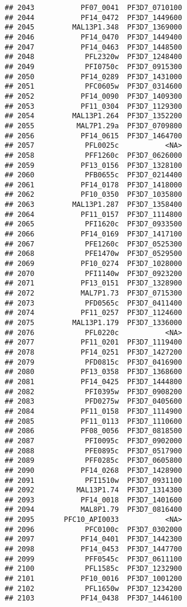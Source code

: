 \documentclass[12pt, a4paper]{article}\usepackage[]{graphicx}\usepackage[]{color}
\makeatletter
\newenvironment{kframe}{%
 \def\at@end@of@kframe{}%
 \ifinner\ifhmode%
  \def\at@end@of@kframe{\end{minipage}}%
  \begin{minipage}{\columnwidth}%
 \fi\fi%
 \def\FrameCommand##1{\hskip\@totalleftmargin \hskip-\fboxsep
 \colorbox{shadecolor}{##1}\hskip-\fboxsep
     \hskip-\linewidth \hskip-\@totalleftmargin \hskip\columnwidth}%
 \MakeFramed {\advance\hsize-\width
   \@totalleftmargin\z@ \linewidth\hsize
   \@setminipage}}%
 {\par\unskip\endMakeFramed%
 \at@end@of@kframe}
\newenvironment{knitrout}{}{} %
\makeatother
\begin{document}
\begin{knitrout}
\begin{kframe}
\begin{verbatim}
## 2043           PF07_0041  PF3D7_0710100
## 2044           PF14_0472  PF3D7_1449600
## 2045         MAL13P1.348  PF3D7_1369000
## 2046           PF14_0470  PF3D7_1449400
## 2047           PF14_0463  PF3D7_1448500
## 2048            PFL2320w  PF3D7_1248400
## 2049            PFI0750c  PF3D7_0915300
## 2050           PF14_0289  PF3D7_1431000
## 2051            PFC0605w  PF3D7_0314600
## 2052           PF14_0090  PF3D7_1409300
## 2053           PF11_0304  PF3D7_1129300
## 2054         MAL13P1.264  PF3D7_1352200
## 2055          MAL7P1.29a  PF3D7_0709800
## 2056           PF14_0615  PF3D7_1464700
## 2057            PFL0025c           <NA>
## 2058            PFF1260c  PF3D7_0626000
## 2059           PF13_0156  PF3D7_1328100
## 2060            PFB0655c  PF3D7_0214400
## 2061           PF14_0178  PF3D7_1418000
## 2062           PF10_0350  PF3D7_1035800
## 2063         MAL13P1.287  PF3D7_1358400
## 2064           PF11_0157  PF3D7_1114800
## 2065            PFI1620c  PF3D7_0933500
## 2066           PF14_0169  PF3D7_1417100
## 2067            PFE1260c  PF3D7_0525300
## 2068            PFE1470w  PF3D7_0529500
## 2069           PF10_0274  PF3D7_1028000
## 2070            PFI1140w  PF3D7_0923200
## 2071           PF13_0151  PF3D7_1328900
## 2072           MAL7P1.73  PF3D7_0715300
## 2073            PFD0565c  PF3D7_0411400
## 2074           PF11_0257  PF3D7_1124600
## 2075         MAL13P1.179  PF3D7_1336000
## 2076            PFL0220c           <NA>
## 2077           PF11_0201  PF3D7_1119400
## 2078           PF14_0251  PF3D7_1427200
## 2079            PFD0815c  PF3D7_0416900
## 2080           PF13_0358  PF3D7_1368600
## 2081           PF14_0425  PF3D7_1444800
## 2082            PFI0395w  PF3D7_0908200
## 2083            PFD0275w  PF3D7_0405600
## 2084           PF11_0158  PF3D7_1114900
## 2085           PF11_0113  PF3D7_1110600
## 2086           PF08_0056  PF3D7_0818500
## 2087            PFI0095c  PF3D7_0902000
## 2088            PFE0895c  PF3D7_0517900
## 2089            PFF0285c  PF3D7_0605800
## 2090           PF14_0268  PF3D7_1428900
## 2091            PFI1510w  PF3D7_0931100
## 2092          MAL13P1.74  PF3D7_1314300
## 2093           PF14_0018  PF3D7_1401600
## 2094           MAL8P1.79  PF3D7_0816400
## 2095       PFC10_API0033           <NA>
## 2096            PFC0100c  PF3D7_0302000
## 2097           PF14_0401  PF3D7_1442300
## 2098           PF14_0453  PF3D7_1447700
## 2099            PFF0545c  PF3D7_0611100
## 2100            PFL1585c  PF3D7_1232900
## 2101           PF10_0016  PF3D7_1001200
## 2102            PFL1650w  PF3D7_1234200
## 2103           PF14_0438  PF3D7_1446100

\end{verbatim}
\end{kframe}
\end{knitrout}
\end{document}
